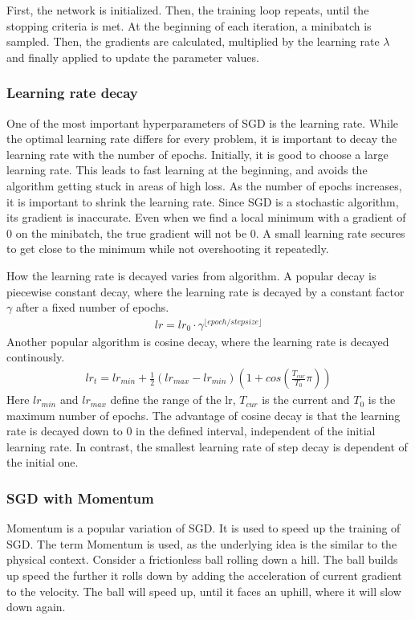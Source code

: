 First, the network is initialized. Then, the training loop repeats, until the
stopping criteria is met. At the beginning of each iteration, a minibatch is sampled. Then, the
gradients are calculated, multiplied by the learning rate $\lambda$ and finally
applied to update the parameter values.


\subsubsection{Learning rate decay}\label{sub:Learing_rate_decay}
One of the most important hyperparameters of SGD is the learning rate. While the
optimal learning rate differs for every problem, it is important to decay the
learning rate with the number of epochs. Initially, it is good to choose a large
learning rate. This leads to fast learning at the beginning, and avoids the
algorithm getting stuck in areas of high loss. As the number of epochs
increases, it is important to shrink the learning rate. Since SGD is a
stochastic algorithm, its gradient is inaccurate. Even when we find a local
minimum with a gradient of 0 on the minibatch, the true gradient will not be 0.
A small learning rate secures to get close to the minimum while not overshooting
it repeatedly.

How the learning rate is decayed varies from algorithm. A popular decay is
piecewise constant decay, where the learning rate is decayed by a constant
factor $\gamma$ after a fixed number of epochs.
\begin{align}
    lr = lr_0 \cdot \gamma^{\lfloor epoch/stepsize \rfloor}
\end{align}
Another popular algorithm is cosine decay, where the learning rate is decayed
continously.
\begin{align}\label{eq:cosine_decay}
    lr_t = lr_{min} + \frac{1}{2} (lr_{max} - lr_{min})(1+cos(\frac{T_{cur}}{T_0}\pi))
\end{align}
Here $lr_{min}$ and $lr_{max}$ define the range of the lr, $T_{cur}$
is the current and $T_0$ is the maximum number of epochs. The advantage of
cosine decay is that the learning rate is decayed down to 0 in the defined
interval, independent of the initial learning rate. In contrast, the smallest
learning rate of step decay is dependent of the initial one.

\subsubsection{SGD with Momentum}\label{sub:Momentum}
Momentum is a popular variation of SGD. It is used to speed up the training of
SGD. The term Momentum is used, as the underlying idea is the similar to the
physical context. Consider a frictionless ball rolling down a hill. The ball
builds up speed the further it rolls down by adding the acceleration of current
gradient to the velocity. The ball will speed up, until it faces an uphill,
where it will slow down again.

